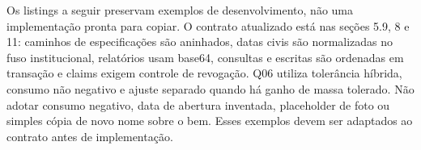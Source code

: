 \begin{explicacao}
Os listings a seguir preservam exemplos de desenvolvimento, não uma implementação pronta para copiar. O contrato atualizado está nas seções 5.9, 8 e 11: caminhos de especificações são aninhados, datas civis são normalizadas no fuso institucional, relatórios usam base64, consultas e escritas são ordenadas em transação e claims exigem controle de revogação. Q06 utiliza tolerância híbrida, consumo não negativo e ajuste separado quando há ganho de massa tolerado. Não adotar consumo negativo, data de abertura inventada, placeholder de foto ou simples cópia de novo nome sobre o bem. Esses exemplos devem ser adaptados ao contrato antes de implementação.
\end{explicacao}


